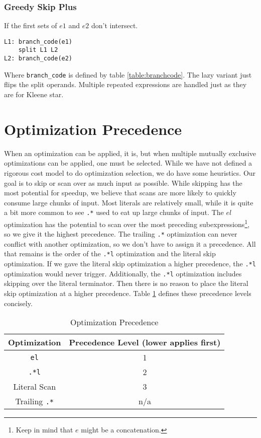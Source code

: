\subsubsection{Greedy Skip Plus}

If the first sets of $e1$ and $e2$ don't intersect.

\begin{verbatim}
L1: branch_code(e1)
    split L1 L2
L2: branch_code(e2)
\end{verbatim}

Where \verb'branch_code' is defined by table \ref{table:branchcode}.
The lazy variant just flips the split operands. Multiple
repeated expressions are handled just as they are for
Kleene star.

\section{Optimization Precedence}
\label{section:optprecedence}

When an optimization can be applied, it is, but when multiple
mutually exclusive optimizations can be applied, one must be
selected. While we have not defined a rigorous cost model
to do optimization selection, we do have some heuristics.
Our goal is to skip or scan over as much input as possible.
While skipping has the most potential for speedup, we
believe that scans are more likely to quickly consume large
chunks of input. Most literals are relatively small, while
it is quite a bit more common to see \verb'.*' used to eat
up large chunks of input. The $el$ optimization has the
potential to scan over the most preceding subexpressions\footnote{
Keep in mind that $e$ might be a concatenation.},
so we give it the highest precedence. The trailing \verb'.*' optimization
can never conflict with another optimization, so we don't have to
assign it a precedence. All that remains is the order of the \verb'.*l'
optimization and the literal skip optimization. If we gave the
literal skip optimization a higher precedence, the \verb'.*l'
optimization would never trigger. Additionally, the \verb'.*l'
optimization includes skipping over the literal terminator.
Then there is no reason to place the literal skip optimization
at a higher precedence. Table \ref{table:optprec} defines these
precedence levels concisely.

\begin{table}
\caption{Optimization Precedence}
\label{table:optprec}

\centering

\begin{tabular}{| c | c |} \hline
Optimization & Precedence Level (lower applies first) \\ \hline
\verb'el' & 1 \\ \hline
\verb'.*l' & 2 \\ \hline
Literal Scan & 3 \\ \hline
Trailing \verb'.*' & n/a \\ \hline
\end{tabular}
\end{table}

